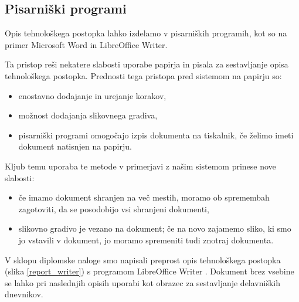 \documentclass[a4paper, 12pt]{book}
\begin{document}
\subsection{Pisarniški programi}

Opis tehnološkega postopka lahko izdelamo v pisarniških programih, kot so na primer Microsoft Word in LibreOffice Writer.

Ta pristop reši nekatere slabosti uporabe papirja in pisala za sestavljanje opisa tehnološkega postopka.
Prednosti tega pristopa pred sistemom na papirju so:
\begin{itemize}
	\item enostavno dodajanje in urejanje korakov,
	\item možnost dodajanja slikovnega gradiva,
	\item pisarniški programi omogočajo izpis dokumenta na tiskalnik, če želimo imeti dokument natisnjen na papirju.
\end{itemize}

Kljub temu uporaba te metode v primerjavi z našim sistemom prinese nove slabosti:
\begin{itemize}
	\item če imamo dokument shranjen na več mestih, moramo ob spremembah zagotoviti, da se posodobijo vsi shranjeni dokumenti,
	\item slikovno gradivo je vezano na dokument; če na novo zajamemo sliko, ki smo jo vstavili v dokument, jo moramo spremeniti tudi znotraj dokumenta.
\end{itemize}

V sklopu diplomske naloge smo napisali preprost opis tehnološkega postopka (slika \ref{report_writer}) s programom LibreOffice Writer \cite{writer}.
Dokument brez vsebine se lahko pri naslednjih opisih uporabi kot obrazec za sestavljanje delavniških dnevnikov.
\clearpage
\end{document}
